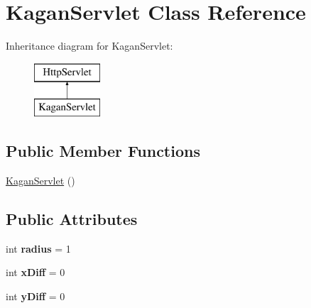 \hypertarget{class_kagan_servlet}{}\section{Kagan\+Servlet Class Reference}
\label{class_kagan_servlet}
Inheritance diagram for Kagan\+Servlet\+:\begin{figure}[H]
\begin{center}
\leavevmode
\includegraphics[height=2.000000cm]{class_kagan_servlet}
\end{center}
\end{figure}
\subsection*{Public Member Functions}
\begin{DoxyCompactItemize}
\item 
\hyperlink{class_kagan_servlet_aa9733d9af94d7f9e4fd26e7d4dddca59}{Kagan\+Servlet} ()
\end{DoxyCompactItemize}
\subsection*{Public Attributes}
\begin{DoxyCompactItemize}
\item 
\hypertarget{class_kagan_servlet_abb3da60d4385e88b231d42c79d3c6c0c}{}int {\bfseries radius} = 1\label{class_kagan_servlet_abb3da60d4385e88b231d42c79d3c6c0c}

\item 
\hypertarget{class_kagan_servlet_a59cd96b1ff9052d22081eaa587f295fa}{}int {\bfseries x\+Diff} = 0\label{class_kagan_servlet_a59cd96b1ff9052d22081eaa587f295fa}

\item 
\hypertarget{class_kagan_servlet_a4078c0c4a4dcd1142ab23466b6ea0e68}{}int {\bfseries y\+Diff} = 0\label{class_kagan_servlet_a4078c0c4a4dcd1142ab23466b6ea0e68}

\end{DoxyCompactItemize}
